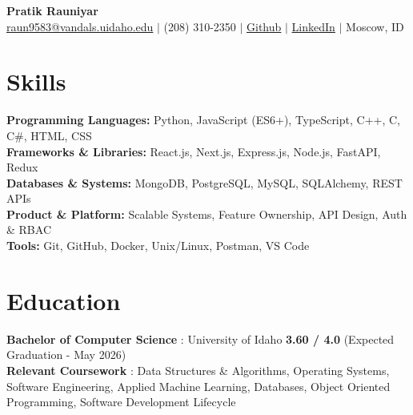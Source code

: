 \documentclass[10pt]{article}
\begin{document}
\small

\begin{center}
    {\bfseries\Large Pratik Rauniyar} \\ [2pt]
    \href{mailto:raun9583@vandals.uidaho.edu}{raun9583@vandals.uidaho.edu} $|$ 
    (208) 310-2350 $|$ 
    \href{https://github.com/prateekrauniyar345}{Github} $|$ 
    \href{https://www.linkedin.com/in/pratik-rauniyar-531a97174/}{LinkedIn} $|$ 
    Moscow, ID
\end{center}


\vspace{-15pt}

\section*{Skills}
\textbf{Programming Languages:} Python, JavaScript (ES6+), TypeScript, C++, C, C\#, HTML, CSS \\
\textbf{Frameworks \& Libraries:} React.js, Next.js, Express.js, Node.js, FastAPI, Redux \\
\textbf{Databases \& Systems:} MongoDB, PostgreSQL, MySQL, SQLAlchemy, REST APIs \\
\textbf{Product \& Platform:} Scalable Systems, Feature Ownership, API Design, Auth \& RBAC \\
\textbf{Tools:} Git, GitHub, Docker, Unix/Linux, Postman, VS Code


\vspace{-10pt}
\section*{Education}
\textbf{Bachelor of Computer Science} : University of Idaho \hfill \textbf{3.60 / 4.0} (Expected Graduation - May 2026) \\
\textbf{Relevant Coursework} : Data Structures \& Algorithms, Operating Systems, Software Engineering, Applied Machine Learning, Databases, Object Oriented Programming, Software Development Lifecycle

\vspace{-10pt}
\end{document}
